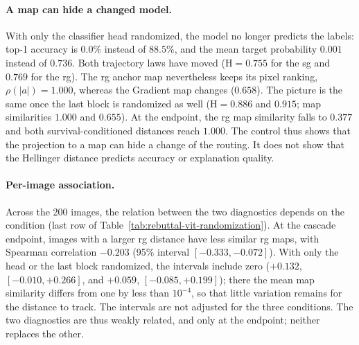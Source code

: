 \paragraph{A map can hide a changed model.}
With only the classifier head randomized, the model no longer predicts the labels: top-1 accuracy is $0.0\%$ instead of $88.5\%$, and the mean target probability $0.001$ instead of $0.736$. Both trajectory laws have moved ($\mathrm H=0.755$ for the \ac{sg} and $0.769$ for the \ac{rg}). The \ac{rg} anchor map nevertheless keeps its pixel ranking, $\rho(|a|)=1.000$, whereas the Gradient map changes ($0.658$). The picture is the same once the last block is randomized as well ($\mathrm H=0.886$ and $0.915$; map similarities $1.000$ and $0.655$). At the endpoint, the \ac{rg} map similarity falls to $0.377$ and both survival-conditioned distances reach $1.000$. The control thus shows that the projection to a map can hide a change of the routing. It does not show that the Hellinger distance predicts accuracy or explanation quality.

\paragraph{Per-image association.}
Across the 200 images, the relation between the two diagnostics depends on the condition (last row of Table~\ref{tab:rebuttal-vit-randomization}). At the cascade endpoint, images with a larger \ac{rg} distance have less similar \ac{rg} maps, with Spearman correlation $-0.203$ (95\% interval $[-0.333,-0.072]$). With only the head or the last block randomized, the intervals include zero ($+0.132$, $[-0.010,+0.266]$, and $+0.059$, $[-0.085,+0.199]$); there the mean map similarity differs from one by less than $10^{-4}$, so that little variation remains for the distance to track. The intervals are not adjusted for the three conditions. The two diagnostics are thus weakly related, and only at the endpoint; neither replaces the other.

